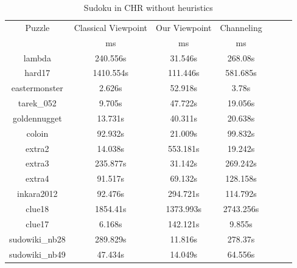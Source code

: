 \documentclass{report}
\begin{document}
\begin{table}[h!]
      \begin{tabular}{|c|c|c|c|c|c|c|}
        \hline
        \multirow{1}{*}{Puzzle} &
          \multicolumn{1}{L|}{Classical Viewpoint} &
          \multicolumn{1}{L|}{Our Viewpoint} &
          \multicolumn{1}{L|}{Channeling} \\
        & ms & ms & ms \\
        \hline
lambda & 240.556s & 31.546s & 268.08s \\
hard17 & 1410.554s & 111.446s & 581.685s \\
eastermonster & 2.626s & 52.918s & 3.78s \\
tarek\_052 & 9.705s & 47.722s & 19.056s \\
goldennugget & 13.731s & 40.311s & 20.638s \\
coloin & 92.932s & 21.009s & 99.832s \\
extra2 & 14.038s & 553.181s & 19.242s \\
extra3 & 235.877s & 31.142s & 269.242s \\
extra4 & 91.517s & 69.132s & 128.158s \\
inkara2012 & 92.476s & 294.721s & 114.792s \\
clue18 & 1854.41s & 1373.993s & 2743.256s \\
clue17 & 6.168s & 142.121s & 9.855s \\
sudowiki\_nb28 & 289.829s & 11.816s & 278.37s \\
sudowiki\_nb49 & 47.434s & 14.049s & 64.556s \\
 \hline
      \end{tabular}
        \caption{Sudoku in CHR without heuristics}

    \end{table}
    
\end{document}

